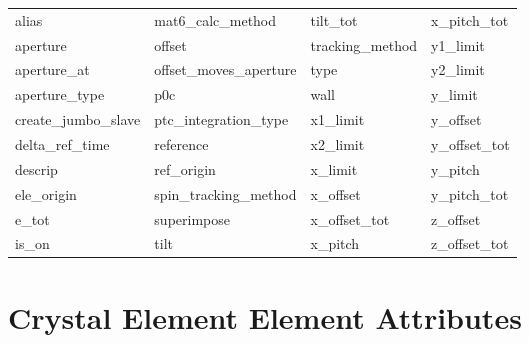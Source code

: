  \begin{tabular}{llll} \toprule
alias                       & mat6_calc_method            & tilt_tot                    & x_pitch_tot                 \\
aperture                    & offset                      & tracking_method             & y1_limit                    \\
aperture_at                 & offset_moves_aperture       & type                        & y2_limit                    \\
aperture_type               & p0c                         & wall                        & y_limit                     \\
create_jumbo_slave          & ptc_integration_type        & x1_limit                    & y_offset                    \\
delta_ref_time              & reference                   & x2_limit                    & y_offset_tot                \\
descrip                     & ref_origin                  & x_limit                     & y_pitch                     \\
ele_origin                  & spin_tracking_method        & x_offset                    & y_pitch_tot                 \\
e_tot                       & superimpose                 & x_offset_tot                & z_offset                    \\
is_on                       & tilt                        & x_pitch                     & z_offset_tot                \\
 \bottomrule
 \end{tabular}
 \vfill
 
 \section{Crystal Element Element Attributes}
 \label{s:list.crystal}
 
